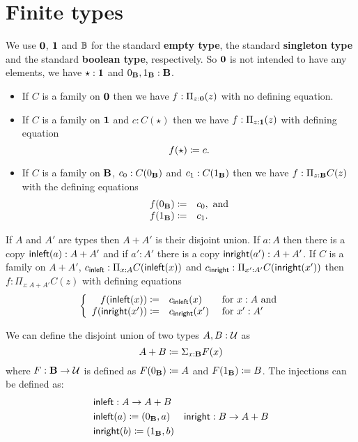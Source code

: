 \section{Finite types}
\label{sec:finite-types}

We use ${\bf 0}$, ${\bf 1}$ and $\mathbb{B}$ for the standard {\bf empty
  type}, the standard {\bf singleton type} and the standard {\bf
  boolean type}, respectively.  So ${\bf 0}$ is not intended to have
any elements, we have $\star:{\bf 1}$ and $0_{\bf B},1_{\bf B}:{\bf B}$.
\begin{itemize}
\item If $C$ is a family on ${\bf 0}$ then we have $f:\Pi_{z:{\bf 0}}(z)$ with no defining equation.
\item If $C$ is a family on ${\bf 1}$ and $c:C(\star)$ then we have $f:\Pi_{z:{\bf 1}}(z)$ with defining equation
  \[ f(\star)\coloneqq c.\]
\item If $C$ is a family on ${\bf B}$, $c_0:C(0_{\bf B})$ 
and $c_1:C(1_{\bf B})$ then we have $f:\Pi_{z:{\bf B}}C(z)$ with the defining equations
 \[ \begin{array}{rl}
f(0_{\bf B}) \coloneqq& c_0, \mbox{ and}\\
f(1_{\bf B}) \coloneqq& c_1.
  \end{array}\]
\end{itemize}

If $A$ and $A'$ are types then $A+A'$ is their disjoint union.  If
$a:A$ then there is a copy ${\sf inleft}(a):A+A'$ and if $a':A'$ there is a
copy ${\sf inright}(a'):A+A'$.
If $C$ is a family on $A+A'$, $c_{\sf inleft}:\Pi_{x:A}C({\sf inleft}(x))$ and $c_{\sf inright}:\Pi_{x':A'}C({\sf inright}(x'))$ then $f:\Pi_{z:A+A'}C(z)$ with defining equations
  \[\left\{\begin{array}{rll} 
f({\sf inleft}(x))\coloneqq& c_{\sf inleft}(x)&\mbox{ for } x:A \mbox{ and}\\
f({\sf inright}(x'))\coloneqq& c_{\sf inright}(x')&\mbox{ for } x':A'\\
\end{array}\right.\]

We can define the disjoint union of two types $A,B:{\mathcal U}$ as
\[A + B \coloneqq \Sigma_{x:{\bf B}}F(x)\]
where $F : {\bf B} \to {\mathcal U}$ is
defined as $F(0_{\bf B}) \coloneqq A$ and $F(1_{\bf B})\coloneqq B$. The
injections can be defined as:
\begin{align*}
& {\sf inleft} :  A \to A+B\\
& {\sf inleft}(a) \coloneqq (0_{\bf B},a)
& {\sf inright} :  B \to A+B\\
& {\sf inright}(b) \coloneqq (1_{\bf B},b)
\end{align*}

